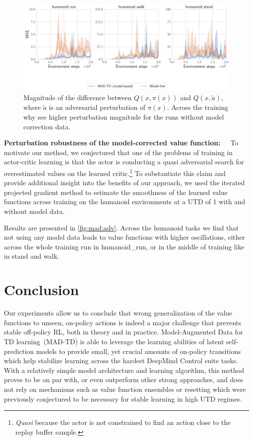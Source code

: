 \begin{figure}[t]
    \centering
    \includegraphics[width=0.75\linewidth]{figures/mad-td/adv_examples.pdf}
    \caption{Magnitude of the difference between $Q(x,\pi(x))$ and $Q(x,\tilde{a})$, where $\tilde{a}$ is an adversarial perturbation of $\pi(x)$. Across the training why see higher perturbation magnitude for the runs without model correction data.}
    \label{fig:mad:adv}
\end{figure}

\textbf{Perturbation robustness of the model-corrected value function:}~~~To motivate our method, we conjectured that one of the problems of training in actor-critic learning is that the actor is conducting a quasi adversarial search for overestimated values on the learned critic.\footnote{\emph{Quasi} because the actor is not constrained to find an action close to the replay buffer sample.}
To substantiate this claim and provide additional insight into the benefits of our approach, we used the iterated projected gradient method \cite{madry2018towards} to estimate the smoothness of the learned value functions across training on the humanoid environments at a UTD of 1 with and without model data.

Results are presented in \autoref{fig:mad:adv}.
Across the humanoid tasks we find that not using any model data leads to value functions with higher oscillations, either across the whole training run in \textsf{\small humanoid\_run}, or in the middle of training like in \textsf{\small stand} and \textsf{\small walk}.

\section{Conclusion}

Our experiments allow us to conclude that wrong generalization of the value functions to unseen, on-policy actions is indeed a major challenge that prevents stable off-policy RL, both in theory and in practice.
Model-Augmented Data for TD learning~(MAD-TD) is able to leverage the learning abilities of latent self-prediction models to provide small, yet crucial amounts of on-policy transitions which help stabilize learning across the hardest DeepMind Control suite tasks.
With a relatively simple model architecture and learning algorithm, this method proves to be on par with, or even outperform other strong approaches, and does not rely on mechanisms such as value function ensembles or resetting which were previously conjectured to be necessary for stable learning in high UTD regimes.

